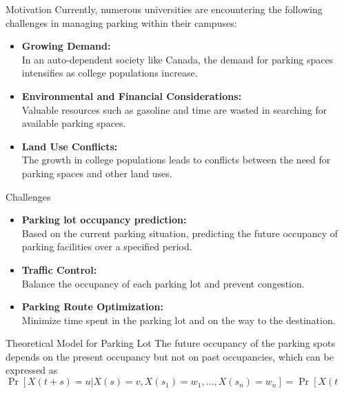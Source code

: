 \documentclass[final, xcolor={table,dvipsnames},t]{beamer}
\newlength{\sepwidth}
\newlength{\colwidth}
\newcommand{\separatorcolumn}{\begin{column}{\sepwidth}\end{column}}
\begin{document}
\begin{frame}[t]
\begin{columns}[t]
\separatorcolumn

\begin{column}{\colwidth}

  \begin{block}{Motivation}
  Currently, numerous universities are encountering the following challenges in managing parking within their campuses: 

    \begin{itemize}
      \item \textbf{Growing Demand:} \\In an auto-dependent society like Canada, the demand for parking spaces intensifies as college populations increase.
      \item \textbf{Environmental and Financial Considerations:}\\ Valuable resources such as gasoline and time are wasted in searching for available parking spaces.
      \item \textbf{Land Use Conflicts:}\\ The growth in college populations leads to conflicts between the need for parking spaces and other land uses.
    \end{itemize}
  \end{block}

  \begin{block}{Challenges}
  
    \begin{itemize}
      \item \textbf{Parking lot occupancy prediction:}\\ Based on the current parking situation, predicting the future occupancy of parking facilities over a specified period.
      \item \textbf{Traffic Control:}\\ Balance the occupancy of each parking lot and prevent congestion.
      \item \textbf{Parking Route Optimization:}\\ Minimize time spent in the parking lot and on the way to the destination.
    \end{itemize}

  \end{block}

  \begin{alertblock}{Theoretical Model for Parking Lot}
    The future occupancy of the parking spots depends on the present occupancy but not on past occupancies, which can be expressed as 
    \begin{equation*}
        \Pr[X(t + s) = u|X(s) = v, X(s_1) = w_1, \ldots, X(s_n) = w_n] = \Pr[X(t + s) = u|X(s) = v]
    \end{equation*}


\end{alertblock}
\end{column}
\end{columns}
\end{frame}
\end{document}

